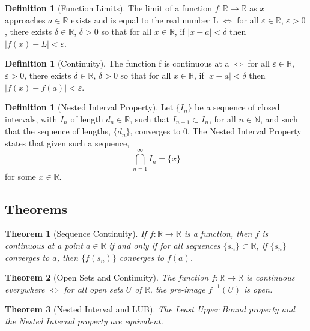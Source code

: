 \documentclass[12pt]{article}
\newtheorem*{thm*}{Theorem}
\theoremstyle{definition}
\newtheorem{defn}[thm]{Definition}
\theoremstyle{remark}
\numberwithin{equation}{section}
\newcommand\R{\mathbb R}    %
\newcommand\N{\mathbb N}    %
\begin{document}
\begin{defn}[Function Limits]
        The limit of a function $f:\R\rightarrow\R$ as $x$ approaches $a \in \R$ exists and is equal to the real number L $\iff$ for all $\varepsilon \in \R$, $\varepsilon > 0$, there exists $\delta \in \R$, $\delta > 0$ so that for all $x \in \R$, if $|x-a| < \delta$ then $|f(x)-L| < \varepsilon$.
\end{defn}



\begin{defn}[Continuity]
        The function f is continuous at a $\iff$ for all $\varepsilon \in \R$, $\varepsilon > 0$, there exists $\delta \in \R$, $\delta > 0$ so that for all $x \in \R$, if $|x-a| < \delta$ then $|f(x)-f(a)| < \varepsilon$.
\end{defn}


\begin{defn}[Nested Interval Property]
        Let $\{I_n\}$ be a sequence of closed intervals, with $I_n$ of length $d_n \in \R$, such that $I_{n+1} \subset I_n$, for all $n \in \N$, and such that the sequence of lengths, $\{d_n\}$, converges to 0. The Nested Interval Property states that given such a sequence, \begin{equation}
                \bigcap\limits_{n=1}^{\infty}I_n = \{x\}
        \end{equation}
        for some $x \in \R$.
\end{defn}



\subsection{Theorems}


\begin{thm*}[Sequence Continuity]
        If $f:\R \rightarrow \R$ is a function, then $f$ is continuous at a point $a \in \R$ if and only if for all sequences $\{s_n\} \subset \R$, if $\{s_n\}$ converges to $a$, then $\{f(s_n)\}$ converges to $f(a)$.
\end{thm*}


\begin{thm*}[Open Sets and Continuity]
        The function $f:\R\rightarrow \R$ is continuous everywhere $\iff$ for all open sets $U$ of $\R$, the pre-image $f^{-1}(U)$ is open.
\end{thm*}


\begin{thm*}[Nested Interval and LUB]
        The Least Upper Bound property and the Nested Interval property are equivalent.
\end{thm*}
\end{document}
